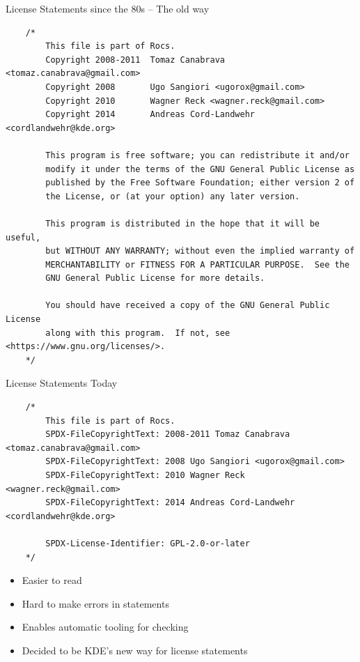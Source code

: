 \documentclass[t,compress,aspectratio=169]{beamer}
\begin{document}
\begin{frame}[fragile]
    {License Statements since the 80s -- The old way}

    \begin{example}
    \tiny
    \begin{verbatim}
    /*
        This file is part of Rocs.
        Copyright 2008-2011  Tomaz Canabrava <tomaz.canabrava@gmail.com>
        Copyright 2008       Ugo Sangiori <ugorox@gmail.com>
        Copyright 2010       Wagner Reck <wagner.reck@gmail.com>
        Copyright 2014       Andreas Cord-Landwehr <cordlandwehr@kde.org>

        This program is free software; you can redistribute it and/or
        modify it under the terms of the GNU General Public License as
        published by the Free Software Foundation; either version 2 of
        the License, or (at your option) any later version.

        This program is distributed in the hope that it will be useful,
        but WITHOUT ANY WARRANTY; without even the implied warranty of
        MERCHANTABILITY or FITNESS FOR A PARTICULAR PURPOSE.  See the
        GNU General Public License for more details.

        You should have received a copy of the GNU General Public License
        along with this program.  If not, see <https://www.gnu.org/licenses/>.
    */
    \end{verbatim}
    \end{example}
\end{frame}

\begin{frame}[fragile]
    {License Statements Today}

    \begin{example}
    \tiny
    \begin{verbatim}
    /*
        This file is part of Rocs.
        SPDX-FileCopyrightText: 2008-2011 Tomaz Canabrava <tomaz.canabrava@gmail.com>
        SPDX-FileCopyrightText: 2008 Ugo Sangiori <ugorox@gmail.com>
        SPDX-FileCopyrightText: 2010 Wagner Reck <wagner.reck@gmail.com>
        SPDX-FileCopyrightText: 2014 Andreas Cord-Landwehr <cordlandwehr@kde.org>

        SPDX-License-Identifier: GPL-2.0-or-later
    */
    \end{verbatim}
    \end{example}
    
    \begin{itemize}
        \item Easier to read
        \item Hard to make errors in statements
        \item Enables automatic tooling for checking
        \item Decided to be KDE's new way for license statements
    \end{itemize}

\end{frame}
\end{document}
